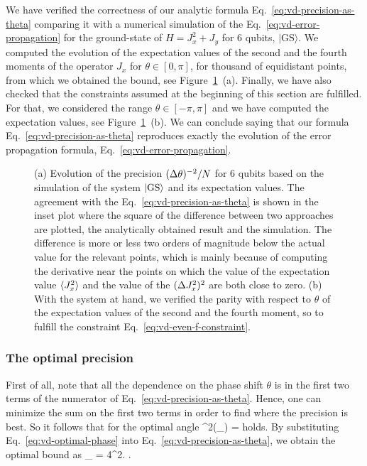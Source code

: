 We have verified the correctness of our analytic formula Eq.~\eqref{eq:vd-precision-as-theta} comparing it with a numerical simulation of the Eq.~\eqref{eq:vd-error-propagation} for the ground-state of $H=J_x^2+J_y$ for 6 qubits, $|\text{GS}\rangle$.
We computed the evolution of the expectation values of the second and the fourth moments of the operator $J_x$ for $\theta \in [0,\pi]$, for thousand of equidistant points, from which we obtained the bound, see Figure~\ref{fig:vd-evolution-of-precision}~(a).
Finally, we have also checked that the constraints assumed at the beginning of this section are fulfilled.
For that, we considered the range $\theta \in [-\pi,\pi]$ and we have computed the expectation values, see Figure~\ref{fig:vd-evolution-of-precision}~(b).
We can conclude saying that our formula Eq.~\eqref{eq:vd-precision-as-theta} reproduces exactly the evolution of the error propagation formula, Eq.~\eqref{eq:vd-error-propagation}.
\begin{figure}[htp]
  \centering
  \caption[(a) Evolution of $\varinv{\theta}/N$. (b) Evolution of the expectation values]{(a) Evolution of the precision $\varinv{\theta}/N$ for 6 qubits based on the simulation of the system $\vert{\text{GS}}\rangle$ and its expectation values.
  The agreement with the Eq.~\eqref{eq:vd-precision-as-theta} is shown in the inset plot where the square of the difference between two approaches are plotted, the analytically obtained result and the simulation.
  The difference is more or less two orders of magnitude below the actual value for the relevant points, which is mainly because of computing the derivative near the points on which the value of the expectation value $\langle{J_x^2}\rangle$ and the value of the $(\Delta J_x^2 )^2$ are both close to zero.
  (b) With the system at hand, we verified the parity with respect to $\theta$ of the expectation values of the second and the fourth moment, so to fulfill the constraint Eq.~\eqref{eq:vd-even-f-constraint}.}
  \label{fig:vd-evolution-of-precision}
\end{figure}

\subsubsection{The optimal precision}
First of all, note that all the dependence on the phase shift $\theta$ is in the first two terms of the numerator of Eq.~\eqref{eq:vd-precision-as-theta}.
Hence, one can minimize the sum on the first two terms in order to find where the precision is best.
So it follows that for the optimal angle
\be
  \label{eq:vd-optimal-phase}
  \tan^2(\theta_{}) = 
\ee
holds.
By substituting Eq.~\eqref{eq:vd-optimal-phase} into Eq.~\eqref{eq:vd-precision-as-theta}, we obtain the optimal bound as
\be
  \varian{\theta}_{} = 
  {4^2}.
  \label{eq:vd-precision}
\ee.

